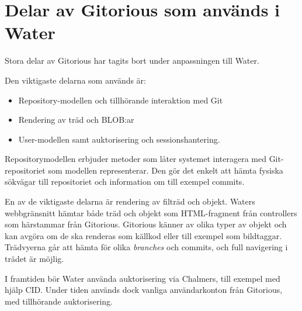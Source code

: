 \section{Delar av Gitorious som används i Water}
Stora delar av Gitorious har tagits bort under anpassningen till Water.

Den viktigaste delarna som används är:
\begin{itemize}
  \item Repository-modellen och tillhörande interaktion med Git
  \item Rendering av träd och BLOB:ar
  \item User-modellen samt auktorisering och sessionshantering.
\end{itemize}

Repositorymodellen erbjuder metoder som låter systemet interagera med Git-repositoriet som modellen representerar. Den gör det enkelt att hämta fysiska sökvägar till repositoriet och information om till exempel commits.

En av de viktigaste delarna är rendering av filträd och objekt. Waters webbgränsnitt hämtar både träd och objekt som HTML-fragment från controllers som härstammar från Gitorious. 
Gitorious känner av olika typer av objekt och kan avgöra om de ska renderas som källkod eller till exempel som bildtaggar. Trädvyerna går att hämta för olika \emph{branches} och commits, och full navigering i trädet är möjlig.

I framtiden bör Water använda auktorisering via Chalmers, till exempel med hjälp CID. Under tiden används dock vanliga användarkonton från Gitorious, med tillhörande auktorisering.

